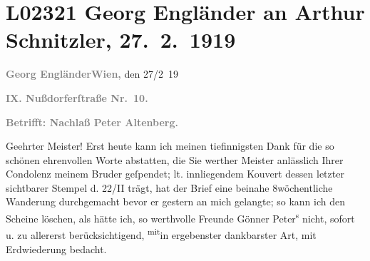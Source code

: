 

\section[Georg Engländer an Arthur Schnitzler, 27. 2. 1919]{L02321 Georg Engländer an Arthur Schnitzler, 27. 2. 1919}
\nopagebreak{}
\rehead{ }\normalsize\beginnumbering{}
\toendnotes[C]{\smallbreak\pagebreak[2]}
\toendnotes[C]{\smallbreak}
\pstart
           {\pb}\textcolor{gray}{\textbf{Georg Engländer}}\hfill \textcolor{gray}{\textbf{Wien,}} den 27/2 19\pend
           
\pstart
           \textcolor{gray}{\textbf{IX. Nußdorferſtraße Nr. 10.}}\pend
           
\pstart
           \textcolor{gray}{\textbf{Betrifft: Nachlaß \textbf{Peter Altenberg}.}}\pend
           
\pstart{}Geehrter Meister!\pend\vspace{0.5em}
\pstart
           Erst heute kann ich meinen tiefinnigsten Dank für die so schönen {\kaufmannsund} ehrenvollen Worte abstatten, die Sie werther Meister
               anlässlich Ihrer Condolenz meinem Bruder geſpendet; lt. innliegendem Kouvert dessen letzter sichtbarer Stempel
               d. 22/II trägt, hat der Brief eine beinahe 8wöchentliche Wanderung
               durchgemacht bevor er gestern an mich gelangte; so kann ich den Scheine löschen, als
               hätte ich, so werthvolle Freunde {\kaufmannsund} Gönner Peter\textsuperscript{s} nicht, sofort u. zu allererst berücksichtigend, \substVorne{}\textsuperscript{mit}\substDazwischen{}in\substHinten{} ergebenster {\kaufmannsund} dankbarster Art, mit Erdwiederung
               bedacht.\pend
           
